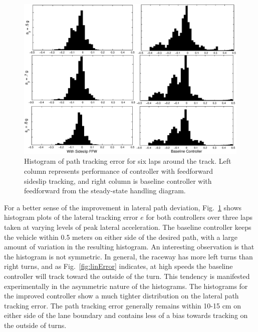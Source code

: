 \documentclass{nVSD2e}
\theoremstyle{plain}
\theoremstyle{definition}
\theoremstyle{remark}
\begin{document}
\begin{figure}[h]
\centering
\includegraphics[width=\columnwidth]{figures/errhist.eps}
\caption{Histogram of path tracking error for six laps around the track. Left column represents performance of controller
with feedforward sideslip tracking, and right column is baseline controller with feedforward from
the steady-state handling diagram.}
\label{fig:errhist}
\end{figure}

For a better sense of the improvement in lateral path deviation, Fig.~\ref{fig:errhist} shows histogram plots of the lateral tracking
error $e$ for both controllers over three laps taken at varying levels of peak lateral acceleration. The baseline controller keeps the vehicle within 0.5 meters
 on either side of the desired path, with a large
amount of variation in the resulting histogram. An interesting observation is that the 
histogram is not symmetric. In general, the raceway has more left turns than right turns, and as Fig.~\ref{fig:linError} indicates, at
high speeds the baseline controller will track toward the outside of the turn. This tendency is manifested experimentally in the asymmetric nature
of the histograms. The histograms for the improved controller show a much tighter distribution on the lateral path tracking 
error. The path tracking error generally remains within 10-15 cm on either side of the lane boundary and contains less of a bias towards tracking
on the outside of turns.  
\end{document}
